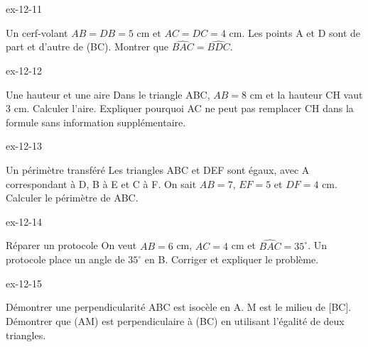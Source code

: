 \begin{blocLivre}{ex-12-11}\begin{exercice}[3]{Un cerf-volant}
$AB=DB=5$ cm et $AC=DC=4$ cm. Les points A et D sont de part et d’autre de (BC). Montrer que $\widehat{BAC}=\widehat{BDC}$.
\label{fig-ex-12-11}
\end{exercice}\end{blocLivre}
\begin{blocLivre}{ex-12-12}\begin{exercice}[3]{Une hauteur et une aire}
Dans le triangle ABC, $AB=8$ cm et la hauteur CH vaut 3 cm. Calculer l’aire. Expliquer pourquoi AC ne peut pas remplacer CH dans la formule sans information supplémentaire.
\label{fig-ex-12-12}
\end{exercice}\end{blocLivre}
\begin{blocLivre}{ex-12-13}\begin{exercice}[3]{Un périmètre transféré}
Les triangles ABC et DEF sont égaux, avec A correspondant à D, B à E et C à F. On sait $AB=7$, $EF=5$ et $DF=4$ cm. Calculer le périmètre de ABC.
\label{fig-ex-12-13}
\end{exercice}\end{blocLivre}
\begin{blocLivre}{ex-12-14}\begin{exercice}[3]{Réparer un protocole}
On veut $AB=6$ cm, $AC=4$ cm et $\widehat{BAC}=35^\circ$. Un protocole place un angle de $35^\circ$ en B. Corriger et expliquer le problème.
\label{fig-ex-12-14}
\end{exercice}\end{blocLivre}
\begin{blocLivre}{ex-12-15}\begin{exercice}[3]{Démontrer une perpendicularité}
ABC est isocèle en A. M est le milieu de [BC]. Démontrer que (AM) est perpendiculaire à (BC) en utilisant l’égalité de deux triangles.
\label{fig-ex-12-15}
\end{exercice}\end{blocLivre}

\clearpage
